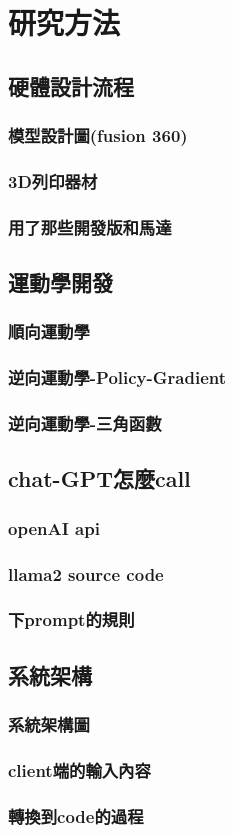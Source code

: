 \documentclass[class=NCU_thesis, crop=false]{standalone}
\begin{document}
\chapter{研究方法}

\section{硬體設計流程}
\subsection{模型設計圖(fusion 360)}
\subsection{3D列印器材}
\subsection{用了那些開發版和馬達}

\section{運動學開發}
\subsection{順向運動學}
\subsection{逆向運動學-Policy-Gradient}
\subsection{逆向運動學-三角函數}

\section{chat-GPT怎麼call}
\subsection{openAI api}
\subsection{llama2 source code}
\subsection{下prompt的規則}

\section{系統架構}
\subsection{系統架構圖}
\subsection{client端的輸入內容}
\subsection{轉換到code的過程}
\end{document}
